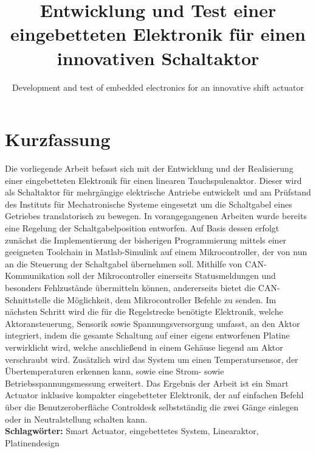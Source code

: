 \documentclass[nochapterpage,bigchapter,linedtoc,longdoc,colorback,accentcolor=tud1c]{tudreport}
\title{Entwicklung und Test einer eingebetteten Elektronik für einen innovativen Schaltaktor}
\subtitle{Development and test of embedded electronics for an innovative shift actuator}
\begin{document}
\maketitle
{}
\cleardoublepage
{}
{}

\cleardoublepage
{}
{}
 
\cleardoublepage
{}
{}
\section*{Kurzfassung}
Die vorliegende Arbeit befasst sich mit der Entwicklung und der Realisierung  einer eingebetteten Elektronik für einen linearen Tauchspulenaktor. Dieser wird als Schaltaktor für mehrgängige elektrische Antriebe entwickelt und am Prüfstand des Instituts für Mechatronische Systeme eingesetzt um die Schaltgabel eines Getriebes translatorisch zu bewegen.
In vorangegangenen Arbeiten wurde bereits eine Regelung der Schaltgabelposition entworfen. Auf Basis dessen erfolgt zunächst die Implementierung der bisherigen Programmierung mittels einer geeigneten Toolchain in Matlab-Simulink auf einem Mikrocontroller, der von nun an die Steuerung der Schaltgabel übernehmen soll. Mithilfe von CAN-Kommunikation soll der Mikrocontroller einerseits Statusmeldungen und besonders Fehlzustände übermitteln können, andererseits bietet die CAN-Schnittstelle die Möglichkeit, dem Mikrocontroller Befehle zu senden. Im nächsten Schritt wird die für die Regelstrecke benötigte Elektronik, welche Aktoransteuerung, Sensorik sowie Spannungsversorgung umfasst, an den Aktor integriert, indem die gesamte Schaltung auf einer eigens entworfenen Platine verwirklicht wird, welche anschließend in einem Gehäuse liegend am Aktor verschraubt wird. Zusätzlich wird das System um einen Temperatursensor, der Übertemperaturen erkennen kann, sowie eine Strom- sowie Betriebsspannungsmessung erweitert.
Das Ergebnis der Arbeit ist ein Smart Actuator inklusive kompakter eingebetteter Elektronik, der auf einfachen Befehl über die Benutzeroberfläche Controldesk selbstständig die zwei Gänge einlegen oder in Neutralstellung schalten kann.\\

\textbf{Schlagwörter:} Smart Actuator, eingebettetes System, Linearaktor, Platinendesign
\end{document}
